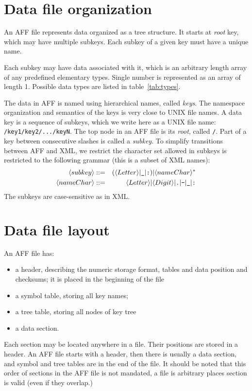 \documentclass[10pt,letterpaper]{article}
\newcommand{\bi}{\begin{itemize}}
\newcommand{\ei}{\end{itemize}}             %
\newcommand{\term}[1]{\textit{#1}}          %
\newcommand{\ctext}[1]{\texttt{#1}}         %
\begin{document}
\section{Data file organization}
An AFF file represents data organized as a tree structure. 
It starts at \term{root} key, which may have multiple subkeys. 
Each subkey of a given key must have a unique name. 

Each subkey may have data associated with it, which is an arbitrary length array of any
predefined elementary types.
Single number is represented as an array of length 1.
Possible data types are listed in table~\ref{tab:types}.

The data in AFF is named using hierarchical names, called \term{keys}. The namespace organization and semantics of the keys is very close to UNIX file names. A data key is a sequence of subkeys, which
we write here as a UNIX file name: \ctext{/key1/key2/.../keyN}. The top node in an AFF file is its
\term{root}, called \ctext{/}. Part of a key between consecutive slashes is called a \term{subkey}. To simplify transitions between AFF and XML, we restrict the character set allowed in subkeys is restricted to the following grammar (this is a subset of XML names):
\begin{eqnarray*}
\langle subkey \rangle & ::= & (\langle Letter \rangle | \verb|_| | \verb|:| ) | \langle nameChar \rangle^{*} \\
\langle nameChar \rangle & ::= & \langle Letter \rangle | \langle Digit \rangle | \verb|.| | \verb|-| | \verb|_| | \verb|:|
\end{eqnarray*}
The subkeys are case-sensitive as in XML.


\section{Data file layout}

An AFF file has:
\bi
\item a header, describing the numeric storage format, tables and data position and checksums; 
it is placed in the beginning of the file
\item a symbol table, storing all key names;
\item a tree table, storing all nodes of key tree
\item a data section.
\ei

Each section may be located anywhere in a file. 
Their positions are stored in a header. 
An AFF file starts with a header, then there is usually a data section, and symbol and tree tables 
are in the end of the file. It should be noted that this order of sections in the AFF file is not mandated, a file is arbitrary places section is valid (even if they overlap.)
\end{document}
